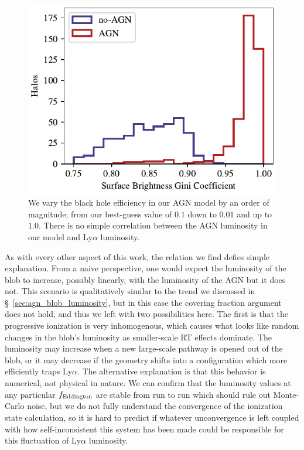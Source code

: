 \begin{figure}
    \centering
    \includegraphics[width=\textwidth,keepaspectratio]{figures/skew_distribution.pdf}
    \caption{
        We vary the black hole efficiency in our AGN model by an order of magnitude; from our best-guess value of $0.1$ down to $0.01$ and up to $1.0$.
        There is no simple correlation between the AGN luminosity in our model and Ly$\alpha$ luminosity.
    }
    \label{fig:eddington_grid}
\end{figure}

As with every other aspect of this work, the relation we find defies simple explanation.
From a naive perspective, one would expect the luminosity of the blob to increase, possibly linearly, with the luminosity of the AGN but it does not.
This scenario is qualitatively similar to the trend we discussed in \S~\ref{sec:agn_blob_luminosity}, but in this case the covering fraction argument does not hold, and thus we left with two possibilities here.
The first is that the progressive ionization is very inhomogenous, which causes what looks like random changes in the blob's luminosity as smaller-scale RT effects dominate.
The luminosity may increase when a new large-scale pathway is opened out of the blob, or it may decrease if the geometry shifts into a configuration which more efficiently traps Ly$\alpha$.
The alternative explanation is that this behavior is numerical, not physical in nature.
We can confirm that the luminosity values at any particular $f_{\rm{Eddington}}$ are stable from run to run which should rule out Monte-Carlo noise, but we do not fully understand the convergence of the ionization state calculation, so it is hard to predict if whatever unconvergence is left coupled with how self-inconsistent this system has been made could be responsible for this fluctuation of Ly$\alpha$ luminosity.
